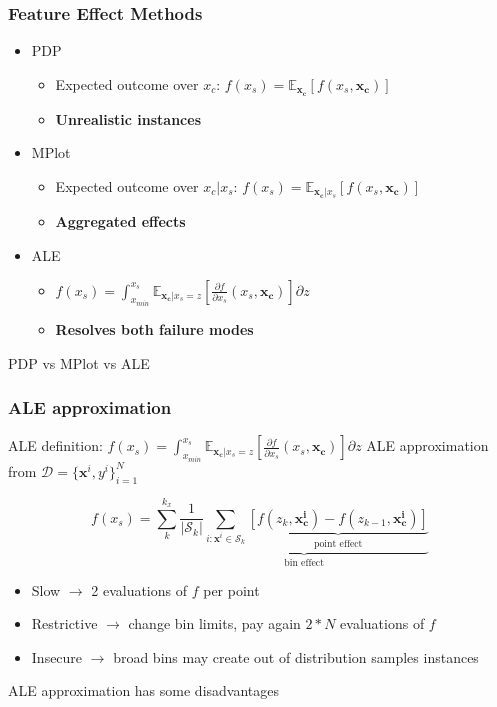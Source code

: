 \documentclass{beamer}
\newcommand{\xb}{\boldsymbol{x}}
\begin{document}
\begin{frame}
  \frametitle{Feature Effect Methods}
  \begin{itemize}
  \item<1-> PDP
    \begin{itemize}
    \item Expected outcome over \(x_c\): \(f(x_s) = \mathbb{E}_{\mathbf{x_c}}[f(x_s, \mathbf{x_c})]\)
    \item \textbf{Unrealistic instances}
    \end{itemize}

  \item<2-> MPlot
    \begin{itemize}
    \item Expected outcome over \(x_c|x_s\): \(f(x_s) = \mathbb{E}_{\mathbf{x_c}|x_s}[f(x_s, \mathbf{x_c})]\)
    \item \textbf{Aggregated effects}
    \end{itemize}

  \item<3-> ALE
    \begin{itemize}
    \item \(f(x_s) = \int_{x_{min}}^{x_s}\mathbb{E}_{\mathbf{x_c}|x_s=z}[ \frac{\partial f}{\partial x_s}(x_s, \mathbf{x_c})] \partial z\)
    \item \textbf{Resolves both failure modes}
    \end{itemize}

  \end{itemize}
  \noindent\makebox[\linewidth]{\rule{\paperwidth}{0.4pt}}
  PDP vs MPlot vs \alert{ALE}
\end{frame}


\begin{frame}
  \frametitle{ALE approximation}
  ALE definition: \( f(x_s) = \int_{x_{min}}^{x_s}\mathbb{E}_{\mathbf{x_c}|x_s=z}[ \frac{\partial f}{\partial x_s}(x_s, \mathbf{x_c})] \partial z \)
  \noindent\makebox[\linewidth]{\rule{\paperwidth}{0.4pt}}
  ALE approximation from \(\mathcal{D} = { \{\mathbf{x}^i, y^i}\}_{i=1}^N\)

    \[f(x_s) = \sum_k^{k_x} \underbrace{\frac{1}{|\mathcal{S}_k|} \sum_{i:\xb^i \in \mathcal{S}_k} \underbrace{[f(z_k, \mathbf{x^i_c}) - f(z_{k-1}, \mathbf{x^i_c})]}_{\text{point effect}}}_{\text{bin effect}} \]

    \begin{itemize}
    \item Slow \( \rightarrow \) 2 evaluations of \(f\) per point
    \item Restrictive \( \rightarrow\) change bin limits, pay again \(2*N\) evaluations of \(f\)
    \item Insecure \( \rightarrow\) broad bins may create out of distribution samples instances
    \end{itemize}

  \noindent\makebox[\linewidth]{\rule{\paperwidth}{0.4pt}}
  ALE approximation has some disadvantages
\end{frame}
\end{document}
